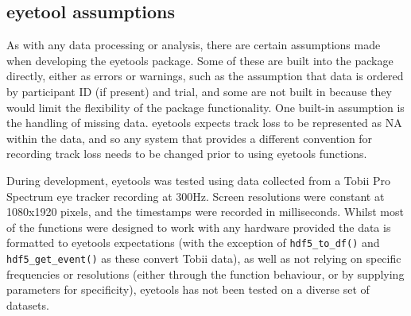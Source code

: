 \documentclass[
  man,
  floatsintext,
  longtable,
  nolmodern,
  notxfonts,
  notimes,
  colorlinks=true,linkcolor=blue,citecolor=blue,urlcolor=blue]{apa7}
\begin{document}
\begin{figure}[H]
\begin{minipage}{0.33\linewidth}
\subcaption{\label{fig-spatial-sac}}


\end{minipage}%

\end{figure}%

\subsection{eyetool assumptions}\label{eyetool-assumptions}

As with any data processing or analysis, there are certain assumptions
made when developing the eyetools package. Some of these are built into
the package directly, either as errors or warnings, such as the
assumption that data is ordered by participant ID (if present) and
trial, and some are not built in because they would limit the
flexibility of the package functionality. One built-in assumption is the
handling of missing data. eyetools expects track loss to be represented
as NA within the data, and so any system that provides a different
convention for recording track loss needs to be changed prior to using
eyetools functions.

During development, eyetools was tested using data collected from a
Tobii Pro Spectrum eye tracker recording at 300Hz. Screen resolutions
were constant at 1080x1920 pixels, and the timestamps were recorded in
milliseconds. Whilst most of the functions were designed to work with
any hardware provided the data is formatted to eyetools expectations
(with the exception of \texttt{hdf5\_to\_df()} and
\texttt{hdf5\_get\_event()} as these convert Tobii data), as well as not
relying on specific frequencies or resolutions (either through the
function behaviour, or by supplying parameters for specificity),
eyetools has not been tested on a diverse set of datasets.
\end{document}
